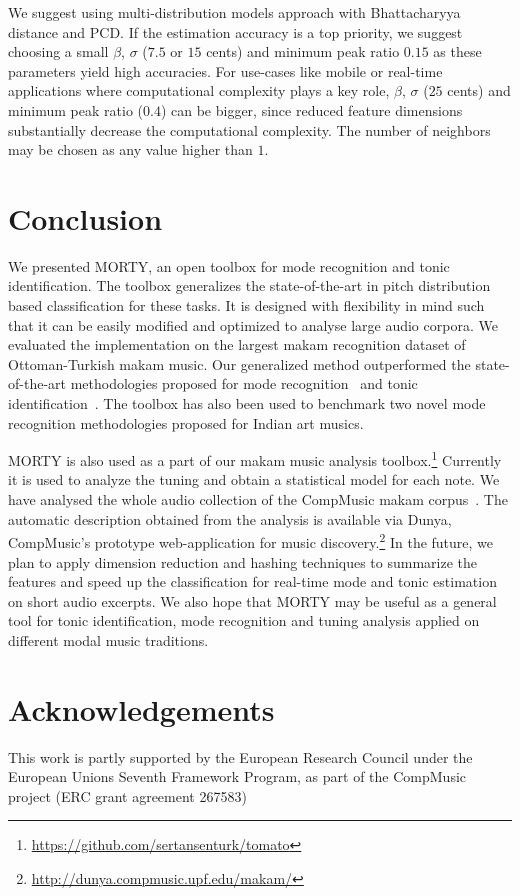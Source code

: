 \documentclass{sig-alternate}
\begin{document}
We suggest using multi-distribution models approach with Bhattacharyya distance and PCD. If the estimation accuracy is a top priority, we suggest choosing a small $\beta$, $\sigma$ ($7.5$ or $15$ cents) and minimum peak ratio $0.15$ as these parameters yield high accuracies. For use-cases like mobile or real-time applications where computational complexity plays a key role, $\beta$, $\sigma$ ($25$ cents) and minimum peak ratio ($0.4$) can be bigger, since reduced feature dimensions substantially decrease the computational complexity. The number of neighbors may be chosen as any value higher than $1$.

\section{Conclusion}\label{sec:conclusion}
We presented MORTY, an open toolbox for mode recognition and tonic identification. The toolbox generalizes the state-of-the-art in pitch distribution based classification for these tasks. It is designed with flexibility in mind such that it can be easily modified and optimized to analyse large audio corpora. We evaluated the implementation on the largest makam recognition dataset of Ottoman-Turkish makam music. Our generalized method outperformed the state-of-the-art methodologies proposed for mode recognition~\cite{bozkurt_makam} and tonic identification~\cite{bozkurt_tonic, atli2014makamFeature_atmm}. The toolbox has also been used to benchmark two novel mode recognition methodologies proposed for Indian art musics. 

MORTY is also used as a part of our makam music analysis toolbox.\footnote{\url{https://github.com/sertansenturk/tomato}} Currently it is used to analyze the tuning and obtain a statistical model for each note. We have analysed the whole audio collection of the CompMusic makam corpus~\cite{compmusic_corpus}. The automatic description obtained from the analysis is available via Dunya, CompMusic's prototype web-application for music discovery.\footnote{\url{http://dunya.compmusic.upf.edu/makam/}} In the future, we plan to apply dimension reduction and hashing techniques to summarize the features and speed up the classification for real-time mode and tonic estimation on short audio excerpts. We also hope that MORTY may be useful as a general tool for tonic identification, mode recognition and tuning analysis applied on different modal music traditions.

\section{Acknowledgements}This work is partly supported by the European Research Council under the European Unions Seventh Framework Program, as part of the CompMusic project (ERC grant agreement 267583)



\end{document}
